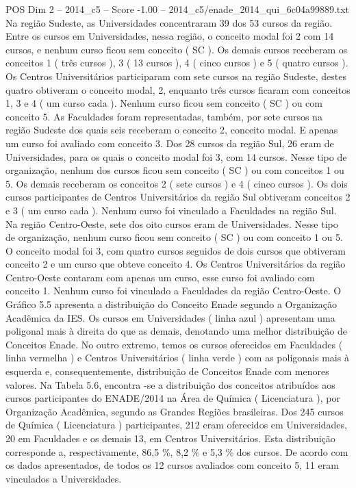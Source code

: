 \begin{textsample}{POS Dim 2 – 2014\_c5 – Score -1.00 – 2014\_c5/enade\_2014\_qui\_6c04a99889.txt}
Na região Sudeste, as Universidades concentraram 39 dos 53 cursos da região.
Entre os cursos em Universidades, nessa região, o conceito modal foi 2 com 14 cursos, e nenhum curso ficou sem conceito ( SC ).
Os demais cursos receberam os conceitos 1 ( três cursos ), 3 ( 13 cursos ), 4 ( cinco cursos ) e 5 ( quatro cursos ).
Os Centros Universitários participaram com sete cursos na região Sudeste, destes quatro obtiveram o conceito modal, 2, enquanto três cursos ficaram com conceitos 1, 3 e 4 ( um curso cada ).
Nenhum curso ficou sem conceito ( SC ) ou com conceito 5.
As Faculdades foram representadas, também, por sete cursos na região Sudeste dos quais seis receberam o conceito 2, conceito modal.
E apenas um curso foi avaliado com conceito 3.
Dos 28 cursos da região Sul, 26 eram de Universidades, para os quais o conceito modal foi 3, com 14 cursos.
Nesse tipo de organização, nenhum dos cursos ficou sem conceito ( SC ) ou com conceitos 1 ou 5.
Os demais receberam os conceitos 2 ( sete cursos ) e 4 ( cinco cursos ).
Os dois cursos participantes de Centros Universitários da região Sul obtiveram conceitos 2 e 3 ( um curso cada ).
Nenhum curso foi vinculado a Faculdades na região Sul.
Na região Centro-Oeste, sete dos oito cursos eram de Universidades.
Nesse tipo de organização, nenhum curso ficou sem conceito ( SC ) ou com conceito 1 ou 5.
O conceito modal foi 3, com quatro cursos seguidos de dois cursos que obtiveram conceito 2 e um curso que obteve conceito 4.
Os Centros Universitários da região Centro-Oeste contaram com apenas um curso, esse curso foi avaliado com conceito 1.
Nenhum curso foi vinculado a Faculdades da região Centro-Oeste.
O Gráfico 5.5 apresenta a distribuição do Conceito Enade segundo a Organização Acadêmica da IES.
Os cursos em Universidades ( linha azul ) apresentam uma poligonal mais à direita do que as demais, denotando uma melhor distribuição de Conceitos Enade.
No outro extremo, temos os cursos oferecidos em Faculdades ( linha vermelha ) e Centros Universitários ( linha verde ) com as poligonais mais à esquerda e, consequentemente, distribuição de Conceitos Enade com menores valores.
Na Tabela 5.6, encontra -se a distribuição dos conceitos atribuídos aos cursos participantes do ENADE/2014 na Área de Química ( Licenciatura ), por Organização Acadêmica, segundo as Grandes Regiões brasileiras.
Dos 245 cursos de Química ( Licenciatura ) participantes, 212 eram oferecidos em Universidades, 20 em Faculdades e os demais 13, em Centros Universitários.
Esta distribuição corresponde a, respectivamente, 86,5 \%, 8,2 \% e 5,3 \% dos cursos.
De acordo com os dados apresentados, de todos os 12 cursos avaliados com conceito 5, 11 eram vinculados a Universidades.

\end{textsample}
